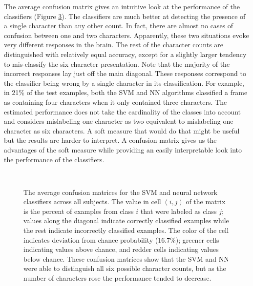 \documentclass[5p,authoryear]{elsarticle}
\begin{document}
The average confusion matrix gives an intuitive look at the performance of the classifiers (Figure \ref{fig:average-confusion}).
The classifiers are much better at detecting the presence of a single character than any other count.
In fact, there are almost no cases of confusion between one and two characters.
Apparently, these two situations evoke very different responses in the brain.
The rest of the character counts are distinguished with relatively equal accuracy,
except for a slightly larger tendency to mis-classify the six character presentation.
Note that the majority of the incorrect responses lay just off the main diagonal.
These responses correspond to the classifier being wrong by a single character in its classification.
For example, in 21\% of the test examples, both the SVM and NN algorithms classified a frame as containing four characters when it only contained three characters.
The estimated performance does not take the cardinality of the classes into account and considers mislabeling one character as two equivalent to mislabeling one character as six characters.
A soft measure that would do that might be useful but the results are harder to interpret.
A confusion matrix gives us the advantages of the soft measure while providing an easily interpretable look into the performance of the classifiers.

\begin{figure}
\centering
\begin{subfigure}{0.3\textwidth}
\centering
\begin{adjustbox}{center}

\end{adjustbox}
\caption{}
\label{fig:average-confusion-svm}
\end{subfigure}
\\
\begin{subfigure}{0.3\textwidth}
\centering
\begin{adjustbox}{center}

\end{adjustbox}
\caption{}
\label{fig:average-confusion-nn}
\end{subfigure}
\caption{The average confusion matrices for the  SVM and  neural network classifiers across all subjects.
The value in cell $(i,j)$ of the matrix is the percent of examples from class $i$ that were labeled as class $j$; values along the diagonal indicate correctly classified examples while the rest indicate incorrectly classified examples.
The color of the cell indicates deviation from chance probability (16.7\%);
greener cells indicating values above chance, and redder cells indicating values below chance.
These confusion matrices show that the SVM and NN were able to distinguish all six possible character counts, but as the number of characters rose the performance tended to decrease.}
\label{fig:average-confusion}
\end{figure}
\end{document}
